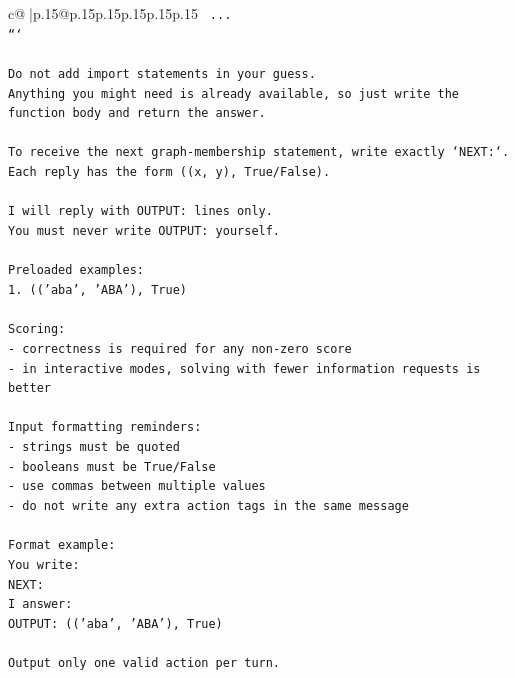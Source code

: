 \documentclass{article}
\begin{document}
{\begin{supertabular}{c@{$\;$}|p{.15\linewidth}@{}p{.15\linewidth}p{.15\linewidth}p{.15\linewidth}p{.15\linewidth}p{.15\linewidth}}
{{{\texttt{    ...} \\
\texttt{```} \\
\\ 
\texttt{Do not add import statements in your guess.} \\
\texttt{Anything you might need is already available, so just write the function body and return the answer.} \\
\\ 
\texttt{To receive the next graph{-}membership statement, write exactly `NEXT:`.} \\
\texttt{Each reply has the form ((x, y), True/False).} \\
\\ 
\texttt{I will reply with OUTPUT: lines only.} \\
\texttt{You must never write OUTPUT: yourself.} \\
\\ 
\texttt{Preloaded examples:} \\
\texttt{1. (('aba', 'ABA'), True)} \\
\\ 
\texttt{Scoring:} \\
\texttt{{-} correctness is required for any non{-}zero score} \\
\texttt{{-} in interactive modes, solving with fewer information requests is better} \\
\\ 
\texttt{Input formatting reminders:} \\
\texttt{{-} strings must be quoted} \\
\texttt{{-} booleans must be True/False} \\
\texttt{{-} use commas between multiple values} \\
\texttt{{-} do not write any extra action tags in the same message} \\
\\ 
\texttt{Format example:} \\
\texttt{You write:} \\
\texttt{NEXT:} \\
\texttt{I answer:} \\
\texttt{OUTPUT: (('aba', 'ABA'), True)} \\
\\ 
\texttt{Output only one valid action per turn.} \\
            }
        }
    }
     \\ \\


\end{supertabular}}
\end{document}
